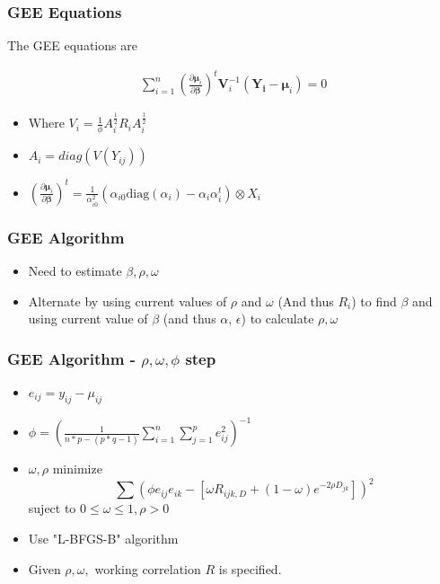 \documentclass{beamer}
\begin{document}
\begin{frame}
\frametitle{GEE Equations}
The GEE equations are

\begin{align*}
  \sum_{i = 1}^n  \left(\frac{\partial  \boldsymbol\mu_i }{\partial \boldsymbol\beta }\right)^t\mathbf{V}_i^{-1}(\mathbf{Y_i} - \boldsymbol\mu_i) = 0
\end{align*}

\begin{itemize}
  \item Where $ V_i = \frac{1}{\phi} A_i^{\tfrac{1}{2}}R_iA_i^{\tfrac{1}{2}}$

  \item $A_i = diag(V(Y_{ij}))$


  \item $ \left(\frac{\partial  \boldsymbol\mu_i }{\partial \boldsymbol\beta }\right)^t  = \frac{1}{\alpha_{i0}^2} (\alpha_{i0} \text{diag}(\alpha_i) - \alpha_i \alpha_i^t)  \otimes X_i$


\end{itemize}



\end{frame}
\begin{frame}
\frametitle{GEE Algorithm}
\begin{itemize}
  \item Need to estimate $\beta, \rho, \omega$
  \item Alternate by using current values of $\rho $ and $\omega$ (And thus $R_i$) to find $\beta$ and using current value of $\beta$ (and thus $\alpha$, $\epsilon$) to calculate $\rho, \omega$
\end{itemize}
\end{frame}
\begin{frame}
\frametitle{GEE Algorithm - $\rho, \omega, \phi$ step}
% 

\begin{itemize}
  \item $e_{ij} = y_{ij} - \mu_{ij}$
  \item $\phi = \left(\frac{1}{n*p - (p*q - 1)}\sum_{i = 1}^n \sum_{j = 1}^p e_{ij}^2 \right) ^{-1}$
  \item $\omega, \rho$ minimize
  \[ \sum (\phi e_{ij}e_{ik} - [ \omega R_{ijk,D} + (1 - \omega) e^{-2 \rho D_{jk}}])^2  \]
  suject to $0 \leq \omega \leq 1, \rho > 0$
  \item Use "L-BFGS-B" algorithm
  \item Given $\rho, \omega,$ working correlation $R$ is specified.
\end{itemize}

\end{frame}
\end{document}
